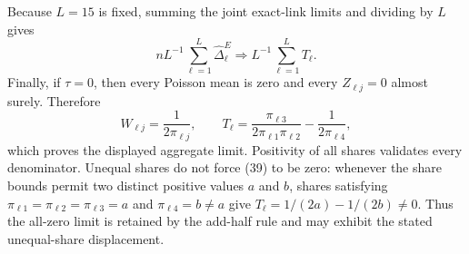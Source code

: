 Because \(L=15\) is fixed, summing the joint exact-link limits and dividing by \(L\) gives
\[
nL^{-1}\sum_{\ell=1}^{L}\widehat\Delta^E_{\ell}
\Rightarrow L^{-1}\sum_{\ell=1}^{L}T_{\ell}.
\tag{38}
\]
Finally, if \(\tau=0\), then every Poisson mean is zero and every \(Z_{\ell j}=0\) almost surely.  Therefore
\[
W_{\ell j}=\frac1{2\pi_{\ell j}},
\qquad
T_{\ell}
=\frac{\pi_{\ell3}}{2\pi_{\ell1}\pi_{\ell2}}
-\frac1{2\pi_{\ell4}},
\tag{39}
\]
which proves the displayed aggregate limit.  Positivity of all shares validates every denominator.  Unequal shares do not force (39) to be zero: whenever the share bounds permit two distinct positive values \(a\) and \(b\), shares satisfying \(\pi_{\ell1}=\pi_{\ell2}=\pi_{\ell3}=a\) and \(\pi_{\ell4}=b\neq a\) give \(T_{\ell}=1/(2a)-1/(2b)\neq0\).  Thus the all-zero limit is retained by the add-half rule and may exhibit the stated unequal-share displacement.
